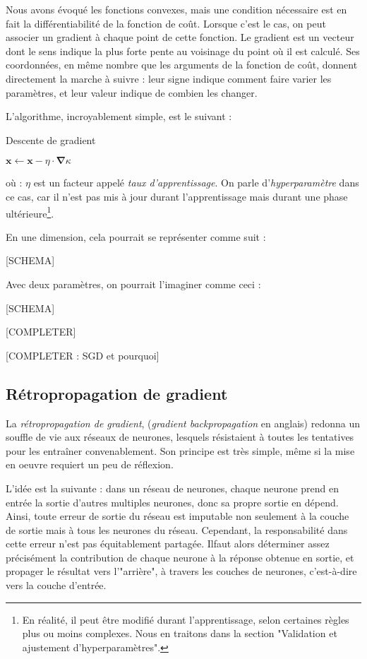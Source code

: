 Nous avons évoqué les fonctions convexes, mais une condition nécessaire est en fait la différentiabilité de la fonction de coût. Lorsque c'est le cas, on peut associer un gradient à chaque point de cette fonction. Le gradient est un vecteur dont le sens indique la plus forte pente au voisinage du point où il est calculé. Ses coordonnées, en même nombre que les arguments de la fonction de coût, donnent directement la marche à suivre : leur signe indique comment faire varier les paramètres, et leur valeur indique de combien les changer.  

L'algorithme, incroyablement simple, est le suivant :

\begin{algorithm}
\caption{Descente de gradient}
\label{alg:desc_grad}
\begin{algorithmic}
\Repeat
	\State \(\boldsymbol{x} \gets \boldsymbol{x} - \eta \cdot \boldsymbol{\nabla} \kappa\)
\Until{\(\norm{\boldsymbol{\nabla} \kappa} \leq \varepsilon\)}
\end{algorithmic}
\end{algorithm}
où : \(\eta\) est un facteur appelé \emph{taux d'apprentissage}. On parle d'\emph{hyperparamètre} dans ce cas, car il n'est pas mis à jour durant l'apprentissage mais durant une phase ultérieure\footnote{En réalité, il peut être modifié durant l'apprentissage, selon certaines règles plus ou moins complexes. Nous en traitons dans la section "Validation et ajustement d'hyperparamètres".}.

En une dimension, cela pourrait se représenter comme suit : 

[SCHEMA]

Avec deux paramètres, on pourrait l'imaginer comme ceci : 

[SCHEMA]

[COMPLETER]

[COMPLETER : SGD et pourquoi]

\subsection{Rétropropagation de gradient}
La \emph{rétropropagation de gradient}, (\emph{gradient backpropagation} en anglais) redonna un souffle de vie aux réseaux de neurones, lesquels résistaient à toutes les tentatives pour les entraîner convenablement. Son principe est très simple, même si la mise en oeuvre requiert un peu de réflexion.

L'idée est la suivante : dans un réseau de neurones, chaque neurone prend en entrée la sortie d'autres multiples neurones, donc sa propre sortie en dépend. Ainsi, toute erreur de sortie du réseau est imputable non seulement à la couche de sortie mais à tous les neurones du réseau. Cependant, la responsabilité dans cette erreur n'est pas équitablement partagée. Ilfaut alors déterminer assez précisément la contribution de chaque neurone à la réponse obtenue en sortie, et propager le résultat vers l'"arrière", à travers les couches de neurones, c'est-à-dire vers la couche d'entrée. 

